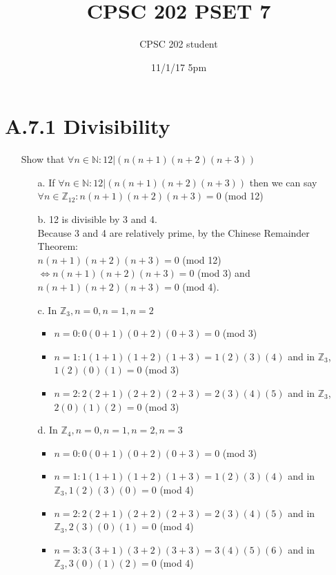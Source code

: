 \documentclass[12pt]{article}
\title{CPSC 202 PSET 7}
\author{CPSC 202 student}
\date{11/1/17 5pm}
\begin{document}
\maketitle

\section*{A.7.1 Divisibility}
\begin{enumerate}
  \item[] Show that $\forall n \in \mathbb{N} : 12 | (n(n+1)(n+2)(n+3))$
    \begin{enumerate}
      \item[a.] If $\forall n \in \mathbb{N} : 12 | (n(n+1)(n+2)(n+3))$ then we can say $\forall n \in \mathbb{Z}_{12} : n(n+1)(n+2)(n+3) = 0$ (mod 12)
      \item[b.] 12 is divisible by 3 and 4. \\
        Because 3 and 4 are relatively prime, by the Chinese Remainder Theorem: \\ 
        $n(n+1)(n+2)(n+3) = 0$ (mod 12) $\iff n(n+1)(n+2)(n+3) = 0$ (mod 3) and $n(n+1)(n+2)(n+3) = 0$ (mod 4).
      \item[c.] In $\mathbb{Z}_3, n = 0, n = 1, n = 2$
        \begin{itemize}
          \item $n=0: 0(0+1)(0+2)(0+3) = 0$ (mod 3)
          \item $n=1: 1(1+1)(1+2)(1+3) = 1(2)(3)(4)$ and in $\mathbb{Z}_3$, $1(2)(0)(1) = 0$ (mod 3) 
          \item $n=2: 2(2+1)(2+2)(2+3) = 2(3)(4)(5)$ and in $\mathbb{Z}_3$, $2(0)(1)(2) = 0$ (mod 3) 
        \end{itemize}
      \item[d.] In $\mathbb{Z}_4, n = 0, n = 1, n = 2, n = 3$
        \begin{itemize}
          \item $n=0: 0(0+1)(0+2)(0+3) = 0$ (mod 3)
          \item $n=1: 1(1+1)(1+2)(1+3) = 1(2)(3)(4)$ and in $\mathbb{Z}_3, 1(2)(3)(0) = 0$ (mod 4)
          \item $n=2: 2(2+1)(2+2)(2+3) = 2(3)(4)(5)$ and in $\mathbb{Z}_3, 2(3)(0)(1) = 0$ (mod 4)
          \item $n=3: 3(3+1)(3+2)(3+3) = 3(4)(5)(6)$ and in $\mathbb{Z}_3, 3(0)(1)(2) = 0$ (mod 4)
        \end{itemize}
    \end{enumerate}
\end{enumerate}
\end{document}
